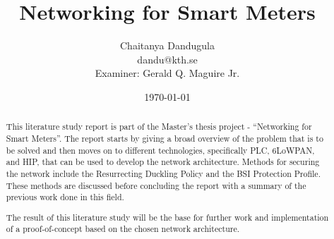 \documentclass[a4paper,12pt,draft]{report}
\begin{document}
\title{Networking for Smart Meters}

\author{Chaitanya Dandugula\\ dandu@kth.se \\
		\small {Examiner: Gerald Q. Maguire Jr.}}
\date{\today}
\maketitle

\begin{abstract}
\indent This literature study report is part of the Master's thesis project - ``Networking for Smart Meters''. The report starts by giving a broad overview of the problem that is to be solved and then moves on to different technologies, specifically PLC, 6LoWPAN, and HIP, that can be used to develop the network architecture. Methods for securing the network include the Resurrecting Duckling Policy and the BSI Protection Profile. These methods are discussed before concluding the report with a summary of the previous work done in this field. 

The result of this literature study will be the base for further work and implementation of a proof-of-concept based on the chosen network architecture. 
\end{abstract}

\tableofcontents
\listoffigures
\listoftables
\renewcommand{\nomname}{List of Abbreviations}
\printnomenclature[2.5cm]










\end{document}
